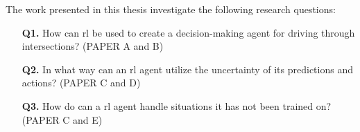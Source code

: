 
The work presented in this thesis investigate the following research questions:
\begin{enumerate}
	\item[\textbf{Q1.}] How can \gls{rl} be used to create a decision-making agent for driving through intersections? (PAPER A and B)
	\item[\textbf{Q2.}] In what way can an \gls{rl} agent utilize the uncertainty of its predictions and actions? (PAPER C and D)
	\item[\textbf{Q3.}] How do can a \gls{rl} agent handle situations it has not been trained on? (PAPER C and E)
	
\end{enumerate}

